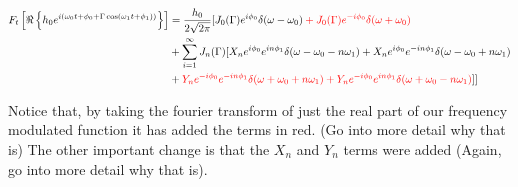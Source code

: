 \documentclass[twocolumn, groupedaddress]{revtex4-1}
\begin{document}
\begin{align}
F_t \left[ \Re \left\{ h_0 e^{i\left( \omega_0 t + \phi_0 + \Gamma \cos( \omega_1 t + \phi_1 ) \right)} \right\} \right] 		\nonumber
&= \frac{h_0}{2\sqrt{2\pi}} \Huge{[} 
	  J_0(\Gamma) e^{ i\phi_0} \delta(\omega - \omega_0)	\color{red} + J_0(\Gamma) e^{-i\phi_0} \delta(\omega + \omega_0) 		\\
&+ \sum_{i=1}^{\infty} J_n(\Gamma) \Huge{[}																					\nonumber
     	X_n e^{ i\phi_0} e^{ in\phi_1} \delta(\omega - \omega_0 - n\omega_1) 
	  + X_n e^{ i\phi_0} e^{-in\phi_1} \delta(\omega - \omega_0 + n\omega_1)	\\
&+ \color{red}   Y_n e^{-i\phi_0} e^{-in\phi_1} \delta(\omega + \omega_0 + n\omega_1) 
   \color{red} + Y_n e^{-i\phi_0} e^{ in\phi_1} \delta(\omega + \omega_0 - n\omega_1)			
   \color{black} \Huge{]} \Huge{]}
\end{align}

Notice that, by taking the fourier transform of just the real part of our frequency modulated function it has added the terms in red.  (Go into more detail why that is)  The other important change is that the $X_n$ and $Y_n$ terms were added (Again, go into more detail why that is).  

\twocolumngrid

\end{document}
